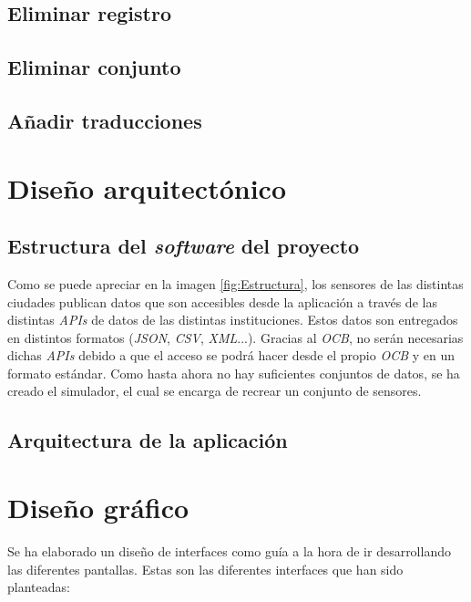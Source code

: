 \subsection{Eliminar registro}

\subsection{Eliminar conjunto}

\subsection{Añadir traducciones}


\section{Diseño arquitectónico}

\subsection{Estructura del \textit{software} del proyecto}
Como se puede apreciar en la imagen \ref{fig:Estructura}, los sensores de las distintas ciudades publican datos que son accesibles desde la aplicación a través de las distintas \textit{APIs} de datos de las distintas instituciones. Estos datos son entregados en distintos formatos (\textit{JSON}, \textit{CSV}, \textit{XML}...).
Gracias al \textit{OCB}, no serán necesarias dichas \textit{APIs} debido a que el acceso se podrá hacer desde el propio \textit{OCB} y en un formato estándar. Como hasta ahora no hay suficientes conjuntos de datos, se ha creado el simulador, el cual se encarga de recrear un conjunto de sensores.

\subsection{Arquitectura de la aplicación}

\section{Diseño gráfico}

Se ha elaborado un diseño de interfaces como guía a la hora de ir desarrollando las diferentes pantallas. Estas son las diferentes interfaces que han sido planteadas:

